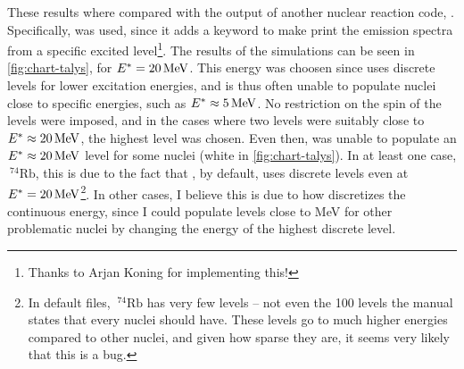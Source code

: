 These results where compared with the output of another nuclear reaction code, \cite{talys:2015}. Specifically,  was used, since it adds a keyword to make  print the emission spectra from a specific excited level\footnote{Thanks to Arjan Koning for implementing this!}. 
The results of the  simulations can be seen in \autoref{fig:chart-talys}, for $E^*=\unit[20]{MeV}$. This energy was choosen since  uses discrete levels for lower excitation energies, and is thus often unable to populate nuclei close to specific energies, such as $E^*\approx\unit[5]{MeV}$.
No restriction on the spin of the levels were imposed, and in the cases where two levels were suitably close to $E^*\approx\unit[20]{MeV}$, the highest level was chosen.
Even then,  was unable to populate an $E^*\approx\unit[20]{MeV}$ level for some nuclei (white in \autoref{fig:chart-talys}). In at least one case, $~^{74}\mathrm{Rb}$, this is due to the fact that , by default, uses discrete levels even at $E^*=\unit[20]{MeV}$\footnote{In  default files, $~^{74}\mathrm{Rb}$ has very few levels -- not even the 100 levels the manual states that every nuclei should have. These levels go to much higher energies compared to other nuclei, and given how sparse they are, it seems very likely that this is a bug.}. 
In other cases, I believe this is due to how  discretizes the continuous energy, since I could populate levels close to \unit[20]{MeV} for other problematic nuclei by changing the energy of the highest discrete level.

